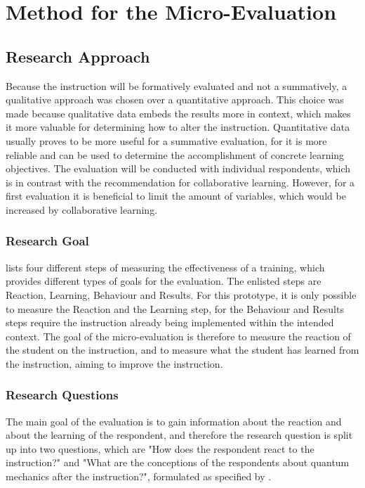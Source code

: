 \documentclass[11pt,twoside]{report} %
\begin{document}
\section{Method for the Micro-Evaluation}
\label{ch:methodevaluation}

\subsection{Research Approach}

Because the instruction will be formatively evaluated and not a summatively, a qualitative approach was chosen over a quantitative approach. This choice was made because qualitative data embeds the results more in context, which makes it more valuable for determining how to alter the instruction. Quantitative data usually proves to be more useful for a summative evaluation, for it is more reliable and can be used to determine the accomplishment of concrete learning objectives. The evaluation will be conducted with individual respondents, which is in contrast with the recommendation for collaborative learning. However, for a first evaluation it is beneficial to limit the amount of variables, which would be increased by collaborative learning.

\subsubsection{Research Goal}

 lists four different steps of measuring the effectiveness of a training, which provides different types of goals for the evaluation. The enlisted steps are Reaction, Learning, Behaviour and Results. For this prototype, it is only possible to measure the Reaction and the Learning step, for the Behaviour and Results steps require the instruction already being implemented within the intended context. The goal of the micro-evaluation is therefore to measure the reaction of the student on the instruction, and to measure what the student has learned from the instruction, aiming to improve the instruction.

\subsubsection{Research Questions}

The main goal of the evaluation is to gain information about the reaction and about the learning of the respondent, and therefore the research question is split up into two questions, which are "How does the respondent react to the instruction?" and "What are the conceptions of the respondents about quantum mechanics after the instruction?", formulated as specified by .
\end{document}
